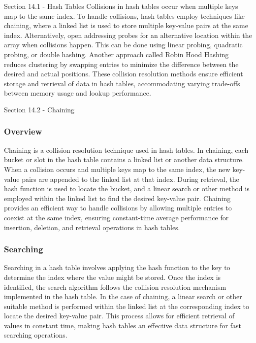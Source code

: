 \begin{notes}{Section 14.1 - Hash Tables}
    Collisions in hash tables occur when multiple keys map to the same index. To handle collisions, hash tables employ techniques like chaining, where a linked list is used to store multiple key-value pairs at 
    the same index. Alternatively, open addressing probes for an alternative location within the array when collisions happen. This can be done using linear probing, quadratic probing, or double hashing. Another 
    approach called Robin Hood Hashing reduces clustering by swapping entries to minimize the difference between the desired and actual positions. These collision resolution methods ensure efficient storage and 
    retrieval of data in hash tables, accommodating varying trade-offs between memory usage and lookup performance.
\end{notes}

\begin{notes}{Section 14.2 - Chaining}
    \subsubsection*{Overview}

    Chaining is a collision resolution technique used in hash tables. In chaining, each bucket or slot in the hash table contains a linked list or another data structure. When a collision occurs and multiple keys 
    map to the same index, the new key-value pairs are appended to the linked list at that index. During retrieval, the hash function is used to locate the bucket, and a linear search or other method is employed 
    within the linked list to find the desired key-value pair. Chaining provides an efficient way to handle collisions by allowing multiple entries to coexist at the same index, ensuring constant-time average 
    performance for insertion, deletion, and retrieval operations in hash tables.
    
    \subsubsection*{Searching}
    
    Searching in a hash table involves applying the hash function to the key to determine the index where the value might be stored. Once the index is identified, the search algorithm follows the collision resolution 
    mechanism implemented in the hash table. In the case of chaining, a linear search or other suitable method is performed within the linked list at the corresponding index to locate the desired key-value pair. This 
    process allows for efficient retrieval of values in constant time, making hash tables an effective data structure for fast searching operations.
    

\end{notes}
